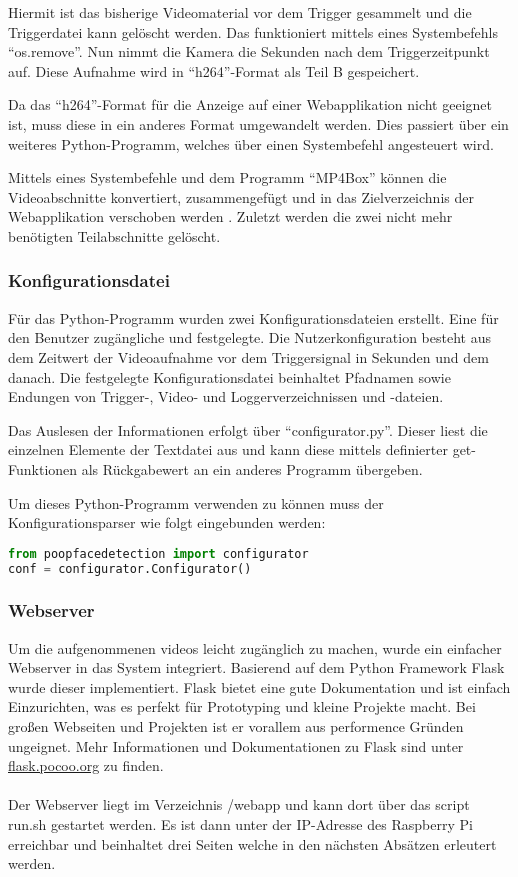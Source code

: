 Hiermit ist das bisherige Videomaterial vor dem Trigger gesammelt und die Triggerdatei kann gelöscht werden. Das funktioniert mittels eines Systembefehls "`os.remove"'. Nun nimmt die Kamera die Sekunden nach dem Triggerzeitpunkt auf. Diese Aufnahme wird in "`h264"'-Format als Teil B gespeichert.

Da das "`h264"'-Format für die Anzeige auf einer Webapplikation nicht geeignet ist, muss diese in ein anderes Format umgewandelt werden. Dies passiert über ein weiteres Python-Programm, welches über einen Systembefehl angesteuert wird.

Mittels eines Systembefehle und dem Programm "`MP4Box"' können die Videoabschnitte konvertiert, zusammengefügt und in das Zielverzeichnis der Webapplikation verschoben werden \cite{convert_video}. Zuletzt werden die zwei nicht mehr benötigten Teilabschnitte gelöscht.

\subsubsection{Konfigurationsdatei}

Für das Python-Programm wurden zwei Konfigurationsdateien erstellt. Eine für den Benutzer zugängliche und festgelegte.
Die Nutzerkonfiguration besteht aus dem Zeitwert der Videoaufnahme vor dem Triggersignal in Sekunden und dem danach.
Die festgelegte Konfigurationsdatei beinhaltet Pfadnamen sowie Endungen von Trigger-, Video- und Loggerverzeichnissen und -dateien.

Das Auslesen der Informationen erfolgt über "`configurator.py"'. Dieser liest die einzelnen Elemente der Textdatei aus und kann diese mittels definierter get-Funktionen als Rückgabewert an ein anderes Programm übergeben.

Um dieses Python-Programm verwenden zu können muss der Konfigurationsparser wie folgt eingebunden werden:

\begin{lstlisting}[language=Python]
from poopfacedetection import configurator
conf = configurator.Configurator()
\end{lstlisting}


\subsubsection{Webserver}
Um die aufgenommenen videos leicht zugänglich zu machen, wurde ein einfacher Webserver in das System integriert. Basierend auf dem Python Framework Flask wurde dieser implementiert. Flask bietet eine gute Dokumentation und ist einfach Einzurichten, was es perfekt für Prototyping und kleine Projekte macht. Bei großen Webseiten und Projekten ist er vorallem aus performence Gründen ungeignet. Mehr Informationen und Dokumentationen zu Flask sind unter \href{http://flask.pocoo.org/}{flask.pocoo.org} zu finden. \\
\\
Der Webserver liegt im Verzeichnis /webapp und kann dort über das script run.sh gestartet werden. Es ist dann unter der IP-Adresse des Raspberry Pi erreichbar und beinhaltet drei Seiten welche in den nächsten Absätzen erleutert werden. 

